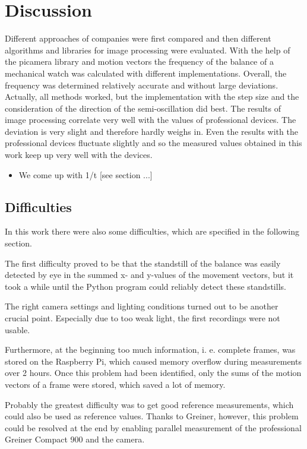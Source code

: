 \documentclass[12pt, a4paper]{report}
\begin{document}
    
    \chapter{Discussion}
    Different approaches of companies were first compared and then different algorithms and libraries for image processing were evaluated. 
    With the help of the picamera library and motion vectors the frequency of the balance of a mechanical watch was calculated with different implementations. Overall, the frequency was determined relatively accurate and without large deviations. Actually, all methods worked, but the implementation with the step size and the consideration of the direction of the semi-oscillation did best.
    The results of image processing correlate very well with the values of professional devices. The deviation is very slight and therefore hardly weighs in. Even the results with the professional devices fluctuate slightly and so the measured values obtained in this work keep up very well with the devices. 
             \begin{itemize}
    \item We come up with 1/t [see section ...]
    \end{itemize}
    
    \section{Difficulties}
In this work there were also some difficulties, which are specified in the following section.

The first difficulty proved to be that the standstill of the balance was easily detected by eye in the summed x- and y-values of the movement vectors, but it took a while until the Python program could reliably detect these standstills.

The right camera settings and lighting conditions turned out to be another crucial point. Especially due to too weak light, the first recordings were not usable. 

Furthermore, at the beginning too much information, i. e. complete frames, was stored on the Raspberry Pi, which caused memory overflow during measurements over 2 hours. Once this problem had been identified, only the sums of the motion vectors of a frame were stored, which saved a lot of memory.

Probably the greatest difficulty was to get good reference measurements, which could also be used as reference values. Thanks to Greiner, however, this problem could be resolved at the end by enabling parallel measurement of the professional Greiner Compact 900 and the camera.
\end{document}
